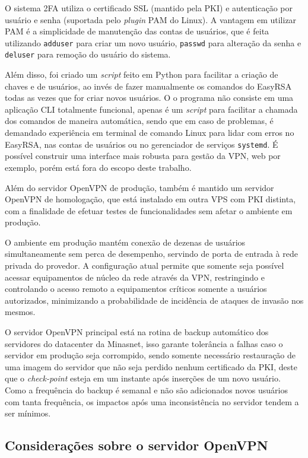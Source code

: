     O sistema 2FA utiliza o certificado SSL (mantido pela PKI) e autenticação por usuário e senha (suportada pelo \textit{plugin} PAM do Linux). A vantagem em utilizar PAM é a simplicidade de manutenção das contas de usuários, que é feita utilizando {\tt adduser} para criar um novo usuário, {\tt passwd} para alteração da senha e {\tt deluser} para remoção do usuário do sistema.
    
    Além disso, foi criado um \textit{script} feito em Python para facilitar a criação de chaves e de usuários, ao invés de fazer manualmente os comandos do EasyRSA todas as vezes que for criar novos usuários. O o programa não consiste em uma aplicação CLI totalmente funcional, apenas é um \textit{script} para facilitar a chamada dos comandos de maneira automática, sendo que em caso de problemas, é demandado experiência em terminal de comando Linux para lidar com erros no EasyRSA, nas contas de usuários ou no gerenciador de serviços {\tt systemd}. É possível construir uma interface mais robusta para gestão da VPN, web por exemplo, porém está fora do escopo deste trabalho.
    
    Além do servidor OpenVPN de produção, também é mantido um servidor OpenVPN de homologação, que está instalado em outra VPS com PKI distinta, com a finalidade de efetuar testes de funcionalidades sem afetar o ambiente em produção.
    
    O ambiente em produção mantém conexão de dezenas de usuários simultaneamente sem perca de desempenho, servindo de porta de entrada à rede privada do provedor. A configuração atual permite que somente seja possível acessar equipamentos de núcleo da rede através da VPN, restringindo e controlando o acesso remoto a equipamentos críticos somente a usuários autorizados, minimizando a probabilidade de incidência de ataques de invasão nos mesmos.
    
    O servidor OpenVPN principal está na rotina de backup automático dos servidores do datacenter da Minasnet, isso garante tolerância a falhas caso o servidor em produção seja corrompido, sendo somente necessário restauração de uma imagem do servidor que não seja perdido nenhum certificado da PKI, deste que o \textit{check-point} esteja em um instante após inserções de um novo usuário. Como a frequência do backup é semanal e não são adicionados novos usuários com tanta frequência, os impactos após uma inconsistência no servidor tendem a ser mínimos.
    
\subsection{Considerações sobre o servidor OpenVPN}


